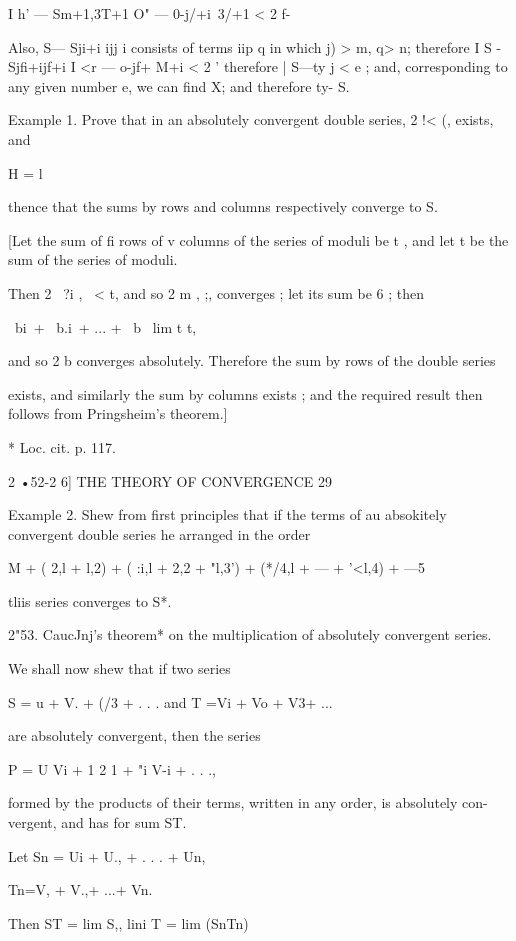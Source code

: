 I h' — Sm+1,3T+1   O" — 0-j/+i\  3/+1 < 2 f- 

Also, S— Sji+i ijj i consists of terms iip q in which j) > m, q> n; therefore 
I S - Sjfi+ijf+i I   <r — o-jf+ M+i < 2   ' therefore | S—ty j < e ; and, corresponding 
to any given number e, we can find X; and therefore ty- S. 

Example 1. Prove that in an absolutely convergent double series, 2 !< (,  exists, and 

H = l 

thence that the sums by rows and columns respectively converge to S. 

[Let the sum of fi rows of v columns of the series of moduli be t  , and let t be the sum 
of the series of moduli. 

Then 2 \ ?i ,   \ < t, and so 2 m , ;, converges ; let its sum be 6  ; then 

\ bi\ + \ b.i\ + ... + \ b \   lim t  t, 

and so 2 b  converges absolutely. Therefore the sum by rows of the double series 

exists, and similarly the sum by columns exists ; and the required result then follows from 
Pringsheim's theorem.] 

* Loc. cit. p. 117. 



2 •52-2 6] THE THEORY OF CONVERGENCE 29 

Example 2. Shew from first principles that if the terms of au absokitely convergent 
double series he arranged in the order 

 M + ( 2,l +  l,2) + ( :i,l +  2,2 + "l,3') + (*/4,l + --- + '<l,4) + ---5 

tliis series converges to  S*. 

2"53. CaucJnj's theorem* on the multiplication of absolutely convergent 
series. 

We shall now shew that if two series 

S = u  + V. + (/3 + . . . 
and T =Vi + Vo + V3+ ... 

are absolutely convergent, then the series 

P = U Vi + 1 2  1 + "i V-i + . . ., 

formed by the products of their terms, written in any order, is absolutely con- 
vergent, and has for sum ST. 

Let Sn = Ui + U., + . . . + Un, 

Tn=V, + V.,+ ...+ Vn. 

Then ST = lim S,, lini T  = lim (SnTn) 

